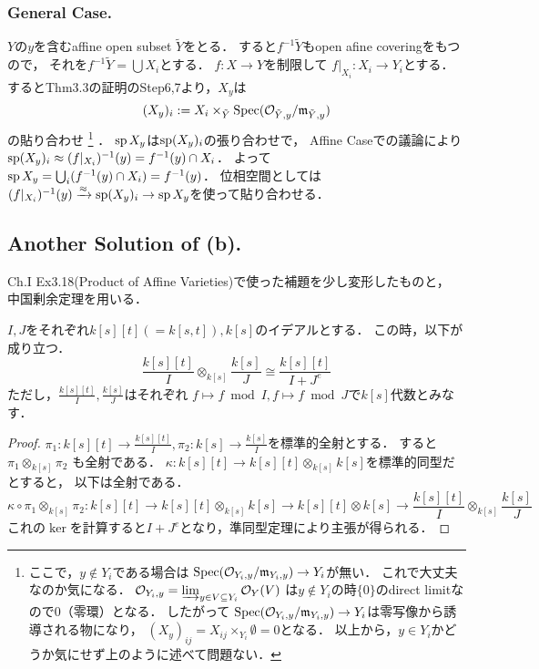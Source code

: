 \documentclass[a4paper]{jsarticle}
\begin{document}
    \subsubsection{General Case.}
    $Y$の$y$を含むaffine open subset $\tilde{Y}$をとる．
    すると$f^{-1}\tilde{Y}$もopen afine coveringをもつので，
    それを$f^{-1}\tilde{Y}=\bigcup X_{i}$とする．
    $f: X \to Y$を制限して
    $f|_{X_{i}}: X_{i} \to Y_i$とする．
    するとThm3.3の証明のStep6,7より，$X_y$は
    \[ (X_y)_{i}:=X_{i} \times_{\tilde{Y}} \operatorname{Spec} (\mathcal{O}_{\tilde{Y},y}/\mathfrak{m}_{\tilde{Y},y}) \]
    の貼り合わせ
    \footnote
    {
    ここで，$y \not \in Y_i$である場合は
    $\operatorname{Spec} (\mathcal{O}_{Y_i,y}/\mathfrak{m}_{Y_i,y}) \to Y_i$が無い．
    これで大丈夫なのか気になる．
    $\mathcal{O}_{Y_i,y}=\varinjlim_{y \in V \subseteq Y_i} \mathcal{O}_Y(V)$
    は$y \not \in Y_i$の時$\{0\}$のdirect limitなので$0$（零環）となる．
    したがって
    $\operatorname{Spec} (\mathcal{O}_{Y_i,y}/\mathfrak{m}_{Y_i,y}) \to Y_i$は零写像から誘導される物になり，
    $(X_y)_{ij}=X_{ij} \times_{Y_i} \emptyset=0$となる．
    以上から，$y \in Y_i$かどうか気にせず上のように述べて問題ない．
    }
    ．
    $\operatorname{sp} X_y$は$\operatorname{sp} (X_y)_{i}$の張り合わせで，
    Affine Caseでの議論により
    $\operatorname{sp} (X_y)_{i} \approx (f|_{X_{i}})^{-1}(y)=f^{-1}(y) \cap X_{i}$．
    よって$\operatorname{sp} X_y=\bigcup_{i} (f^{-1}(y) \cap X_{i})=f^{-1}(y)$．
    位相空間としては
    $(f|_{X_{i}})^{-1}(y) \xrightarrow{\approx} \operatorname{sp} (X_y)_{i} \to \operatorname{sp} X_y$を使って貼り合わせる．

    \subsection{Another Solution of (b).}
    Ch.I Ex3.18(Product of Affine Varieties)で使った補題を少し変形したものと，
    中国剰余定理を用いる．

    \begin{Lemma}
        $I,J$をそれぞれ$k[s][t](=k[s,t]), k[s]$のイデアルとする．
        この時，以下が成り立つ．
        \[ \frac{k[s][t]}{I} \otimes_{k[s]} \frac{k[s]}{J} \cong \frac{k[s][t]}{I+J^e} \]
        ただし，$\frac{k[s][t]}{I}, \frac{k[s]}{J}$はそれぞれ
        $f \mapsto f \bmod I, f \mapsto f \bmod J$で$k[s]$代数とみなす．
    \end{Lemma}
    \begin{proof}
        $\pi_1: k[s][t] \to \frac{k[s][t]}{I}, \pi_2: k[s] \to \frac{k[s]}{I}$を標準的全射とする．
        すると$\pi_1 \otimes_{k[s]} \pi_2$
        も全射である．
        $\kappa: k[s][t] \to k[s][t] \otimes_{k[s]} k[s]$を標準的同型だとすると，
        以下は全射である．
        \[
            \kappa \circ \pi_1 \otimes_{k[s]} \pi_2:
                k[s][t] \to k[s][t] \otimes_{k[s]} k[s]
                \to k[s][t] \otimes k[s]
                \to \frac{k[s][t]}{I} \otimes_{k[s]} \frac{k[s]}{J}
        \]
        これの$\ker$を計算すると$I+J^e$となり，準同型定理により主張が得られる．
    \end{proof}
\end{document}
